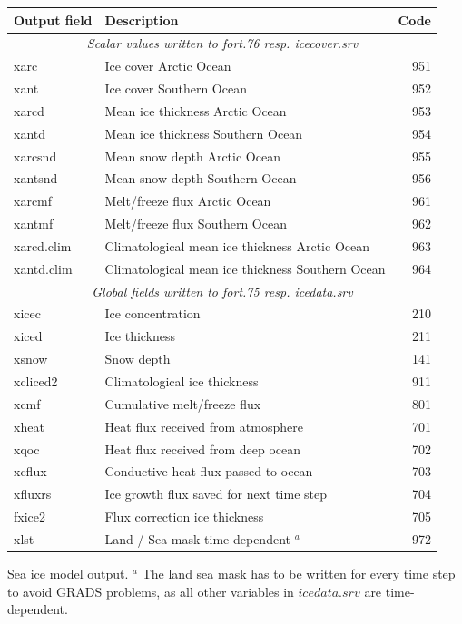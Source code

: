 \btbh
\begin{center}
\begin{tabular}{llr}
\hline
Output field & Description & Code \\
\hline
\multicolumn{3}{c}{\em Scalar values written to fort.76 resp. icecover.srv} \\
xarc	& Ice cover Arctic Ocean		& 951 \\
xant	& Ice cover Southern Ocean		& 952 \\
xarcd	& Mean ice thickness Arctic Ocean	& 953 \\
xantd	& Mean ice thickness Southern Ocean	& 954 \\
xarcsnd	& Mean snow depth Arctic Ocean		& 955 \\
xantsnd	& Mean snow depth Southern Ocean	& 956 \\
xarcmf	& Melt/freeze flux Arctic Ocean		& 961 \\
xantmf	& Melt/freeze flux Southern Ocean	& 962 \\
xarcd.clim & Climatological mean ice thickness Arctic Ocean	& 963 \\
xantd.clim & Climatological mean ice thickness Southern Ocean	& 964 \\
\hline
\multicolumn{3}{c}{\em Global fields written to fort.75 resp. icedata.srv} \\
xicec 	& Ice concentration 			& 210 \\
xiced 	& Ice thickness				& 211 \\
xsnow 	& Snow depth				& 141 \\
xcliced2& Climatological ice thickness		& 911 \\
xcmf	& Cumulative melt/freeze flux		& 801 \\
xheat	& Heat flux received from atmosphere	& 701 \\
xqoc	& Heat flux received from deep ocean	& 702 \\
xcflux	& Conductive heat flux passed to ocean	& 703 \\
xfluxrs	& Ice growth flux saved for next time step & 704 \\
fxice2	& Flux correction ice thickness		& 705 \\
xlst	& Land / Sea mask time dependent $^a$	& 972 \\
\hline
\end{tabular}
\end{center}
\label{ice_output}
\caption{Sea ice model output. $^a$ The land sea mask has to be written for
every time step to avoid GRADS problems, as all other variables in 
$icedata.srv$ are time-dependent.}
\etb


